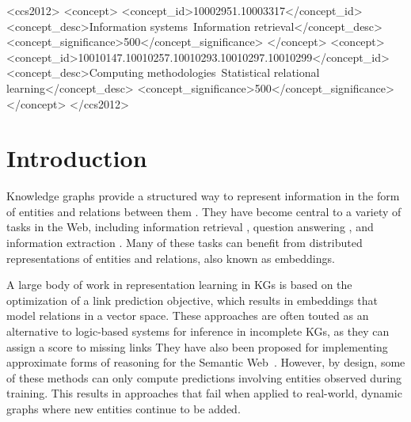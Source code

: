 \documentclass[sigconf]{acmart}
\begin{document}
\begin{CCSXML}
<ccs2012>
   <concept>
       <concept_id>10002951.10003317</concept_id>
       <concept_desc>Information systems~Information retrieval</concept_desc>
       <concept_significance>500</concept_significance>
       </concept>
   <concept>
       <concept_id>10010147.10010257.10010293.10010297.10010299</concept_id>
       <concept_desc>Computing methodologies~Statistical relational learning</concept_desc>
       <concept_significance>500</concept_significance>
       </concept>
 </ccs2012>
\end{CCSXML}



\maketitle

\section{Introduction}

Knowledge graphs provide a structured way to represent information in the form of entities and relations between them \citep{fensel2020knowledge}. They have become central to a variety of tasks in the Web, including information retrieval \citep{dalton2014entity,gerritse2020graph}, question answering \cite{vakulenko2019message,huang2019knowledge}, and information extraction \citep{mintz2009distant,bosselut2019comet,gupta2019care}. Many of these tasks can benefit from distributed representations of entities and relations, also known as embeddings.

A large body of work in representation learning in KGs \citep{nickel2015review,wang2017knowledge} is based on the optimization of a link prediction objective, which results in embeddings that model relations in a vector space. These approaches are often touted as an alternative to logic-based systems for inference in incomplete KGs, as they can assign a score to missing links \citep{drumond2012predict,hamilton2018queries} They have also been proposed for implementing approximate forms of reasoning for the Semantic Web~\cite{hitzler2020neural}. However, by design, some of these methods can only compute predictions involving entities observed during training. This results in approaches that fail when applied to real-world, dynamic graphs where new entities continue to be added.
\end{document}

